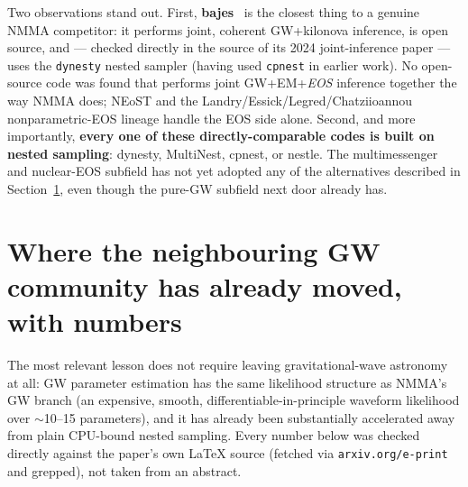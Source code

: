 \documentclass[11pt]{article}
\newcommand{\code}[1]{\texttt{#1}}
\begin{document}
Two observations stand out. First, \textbf{bajes}~\cite{Breschi:2021wzr,Breschi:2024qlc} is
the closest thing to a genuine NMMA competitor: it performs joint, coherent GW+kilonova
inference, is open source, and --- checked directly in the source of its 2024 joint-inference
paper --- uses the \code{dynesty} nested sampler (having used \code{cpnest} in earlier work).
No open-source code was found that performs joint GW+EM+\emph{EOS} inference together the way
NMMA does; NEoST and the Landry/Essick/Legred/Chatziioannou nonparametric-EOS lineage handle
the EOS side alone. Second, and more importantly, \textbf{every one of these
directly-comparable codes is built on nested sampling}: dynesty, MultiNest, cpnest, or
nestle. The multimessenger and nuclear-EOS subfield has not yet adopted any of the
alternatives described in Section~\ref{sec:crosscult}, even though the pure-GW subfield next
door already has.

\section{Where the neighbouring GW community has already moved, with numbers}
\label{sec:crosscult}

The most relevant lesson does not require leaving gravitational-wave astronomy at all: GW
parameter estimation has the same likelihood structure as NMMA's GW branch (an expensive,
smooth, differentiable-in-principle waveform likelihood over $\sim$10--15 parameters), and it
has already been substantially accelerated away from plain CPU-bound nested sampling. Every
number below was checked directly against the paper's own \LaTeX{} source (fetched via
\code{arxiv.org/e-print} and grepped), not taken from an abstract.
\end{document}
